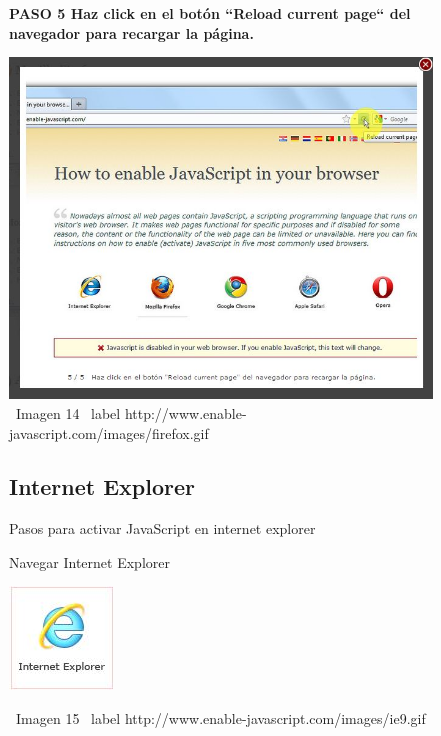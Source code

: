 \documentclass[11pt]{article} %
\begin{document}
\begin{figure}
\begin{center}
\begin{center}
\bf PASO 5
Haz click en el botón ``Reload current page`` del navegador para recargar la página.
\newline
\end{center}
\includegraphics[height=8 cm, width=8 cm] {imagenes/firefox 05.jpg}
\newline
\newline
\ Imagen 14
\ label {http://www.enable-javascript.com/images/firefox.gif }

\end{center}
\end{figure}

\begin{figure}
\subsection{Internet Explorer}
Pasos para activar JavaScript en internet explorer
\begin{center}
\begin{center}
Navegar Internet Explorer

\end{center}
\begin{center}
\includegraphics[height=3 cm, width=3 cm] {imagenes/explorer.jpg}
\end{center}

\ Imagen 15
\ label {http://www.enable-javascript.com/images/ie9.gif }

\end{center}
\end{figure}
\end{document}
